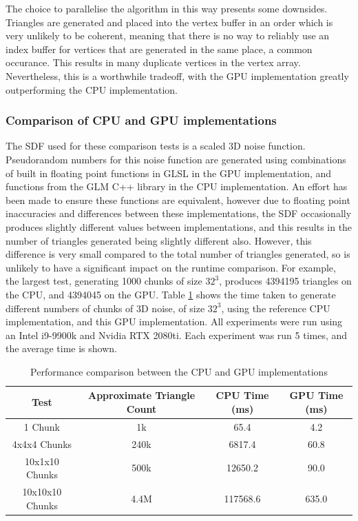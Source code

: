 \documentclass{article}
\begin{document}
The choice to parallelise the algorithm in this way presents some downsides. Triangles are generated and placed into the vertex buffer in an order which is very unlikely to be coherent, meaning that there is no way to reliably use an index buffer for vertices that are generated in the same place, a common occurance. This results in many duplicate vertices in the vertex array. Nevertheless, this is a worthwhile tradeoff, with the GPU implementation greatly outperforming the CPU implementation. 
\subsubsection{Comparison of CPU and GPU implementations}
\label{section:GPUCPUcomparison}
The SDF used for these comparison tests is a scaled 3D noise function. Pseudorandom numbers for this noise function are generated using combinations of built in floating point functions in GLSL in the GPU implementation, and functions from the GLM C++ library in the CPU implementation. An effort has been made to ensure these functions are equivalent, however due to floating point inaccuracies and differences between these implementations, the SDF occasionally produces slightly different values between implementations, and this results in the number of triangles generated being slightly different also. However, this difference is very small compared to the total number of triangles generated, so is unlikely to have a significant impact on the runtime comparison. For example, the largest test, generating 1000 chunks of size $32^3$, produces 4394195 triangles on the CPU, and 4394045 on the GPU.
Table \ref{tab:cpu-gpu-comparison} shows the time taken to generate different numbers of chunks of 3D noise, of size $32^3$, using the reference CPU implementation, and this GPU implementation. All experiments were run using an Intel i9-9900k and Nvidia RTX 2080ti. Each experiment was run 5 times, and the average time is shown.
\begin{table}[H]
  \begin{tabular}{|c|c|c|c|}
    \hline
    Test & Approximate Triangle Count & CPU Time (ms) & GPU Time (ms) \\
    \hline
    \hline
    1 Chunk & 1k & 65.4 & 4.2\\
    4x4x4 Chunks & 240k & 6817.4 & 60.8\\
    10x1x10 Chunks & 500k & 12650.2 & 90.0\\
    10x10x10 Chunks & 4.4M & 117568.6 & 635.0\\
    \hline
    
  \end{tabular}
  \caption{\label{tab:cpu-gpu-comparison}Performance comparison between the CPU and GPU implementations}
\end{table}
\end{document}
